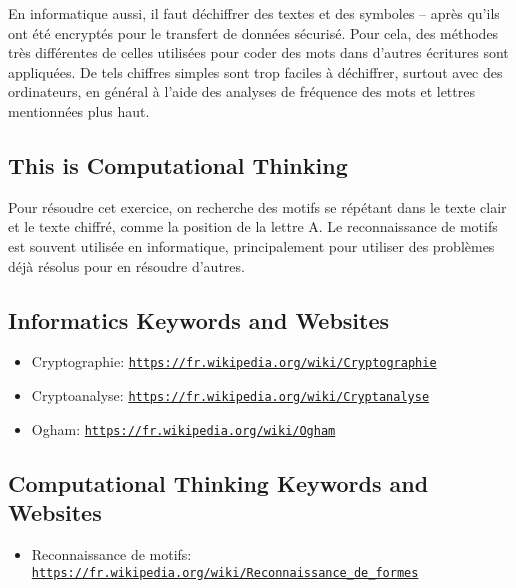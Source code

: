 \documentclass[a4paper,11pt]{report}
\newcommand{\BrochureUrlText}[1]{\texttt{#1}}
\begin{document}
En informatique aussi, il faut déchiffrer des textes et des symboles – après qu’ils ont été encryptés pour le transfert de données sécurisé. Pour cela, des méthodes très différentes de celles utilisées pour coder des mots dans d’autres écritures sont appliquées. De tels chiffres simples sont trop faciles à déchiffrer, surtout avec des ordinateurs, en général à l’aide des analyses de fréquence des mots et lettres mentionnées plus haut.


\subsection*{This is Computational Thinking}

Pour résoudre cet exercice, on recherche des motifs se répétant dans le texte clair et le texte chiffré, comme la position de la lettre A. Le reconnaissance de motifs est souvent utilisée en informatique, principalement pour utiliser des problèmes déjà résolus pour en résoudre d’autres.


\subsection*{Informatics Keywords and Websites}

\begin{itemize}
  \item Cryptographie: \href{https://fr.wikipedia.org/wiki/Cryptographie}{\BrochureUrlText{https://fr.wikipedia.org/wiki/Cryptographie}}
  \item Cryptoanalyse: \href{https://fr.wikipedia.org/wiki/Cryptanalyse}{\BrochureUrlText{https://fr.wikipedia.org/wiki/Cryptanalyse}}
  \item Ogham: \href{https://fr.wikipedia.org/wiki/Ogham}{\BrochureUrlText{https://fr.wikipedia.org/wiki/Ogham}}
\end{itemize}


\subsection*{Computational Thinking Keywords and Websites}

\begin{itemize}
  \item Reconnaissance de motifs: \href{https://fr.wikipedia.org/wiki/Reconnaissance_de_formes}{\BrochureUrlText{https://fr.wikipedia.org/wiki/Reconnaissance\_de\_formes}}
\end{itemize}
\end{document}
